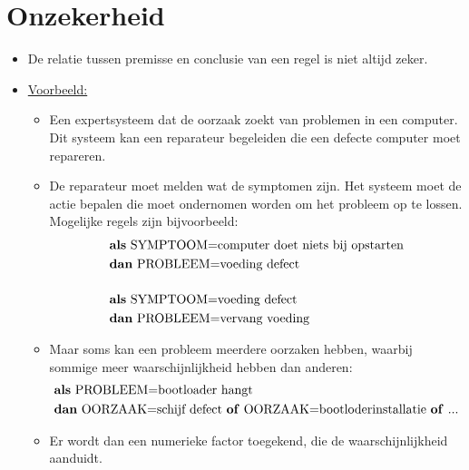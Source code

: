 \section{Onzekerheid}
\begin{itemize}
	\item De relatie tussen premisse en conclusie van een regel is niet altijd zeker.
	\item \underline{Voorbeeld:}
	\begin{itemize}
		\item Een expertsysteem dat de oorzaak zoekt van problemen in een computer. Dit systeem kan een reparateur begeleiden die een defecte computer moet repareren.
		\item De reparateur moet melden wat de symptomen zijn. Het systeem moet de actie bepalen die moet ondernomen worden om het probleem op te lossen. Mogelijke regels zijn bijvoorbeeld:
		\begin{equation*}
		\begin{split}
		& \hbox{\textbf{als} SYMPTOOM=computer doet niets bij opstarten} \\
		& \hbox{\textbf{dan} PROBLEEM=voeding defect} 
		 \\[3ex]
		& \hbox{\textbf{als} SYMPTOOM=voeding defect} \\
		& \hbox{\textbf{dan} PROBLEEM=vervang voeding} 
		\end{split}
		\end{equation*}
		
		\item Maar soms kan een probleem meerdere oorzaken hebben, waarbij sommige meer waarschijnlijkheid hebben dan anderen:
		\begin{equation*}
			\begin{split}
			& \hbox{\textbf{als} PROBLEEM=bootloader hangt} \\
			& \hbox{\textbf{dan} OORZAAK=schijf defect \textbf{of} OORZAAK=bootloderinstallatie \textbf{of} ...} 
			\end{split}
		\end{equation*}
		
		\item Er wordt dan een numerieke factor toegekend, die de waarschijnlijkheid aanduidt. 
		

\end{itemize}
\end{itemize}
